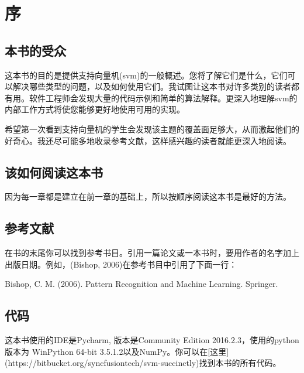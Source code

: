 \chapter*{序}

\section{本书的受众}

这本书的目的是提供支持向量机(svm)的一般概述。您将了解它们是什么，它们可以解决哪些类型的问题，以及如何使用它们。我试图让这本书对许多类别的读者都有用。软件工程师会发现大量的代码示例和简单的算法解释。更深入地理解svm的内部工作方式将使您能够更好地使用可用的实现。

希望第一次看到支持向量机的学生会发现该主题的覆盖面足够大，从而激起他们的好奇心。我还尽可能多地收录参考文献，这样感兴趣的读者就能更深入地阅读。

\section{该如何阅读这本书}

因为每一章都是建立在前一章的基础上，所以按顺序阅读这本书是最好的方法。

\section{参考文献}

在书的末尾你可以找到参考书目。引用一篇论文或一本书时，要用作者的名字加上出版日期。例如，(Bishop, 2006)在参考书目中引用了下面一行：

Bishop, C. M. (2006). Pattern Recognition and Machine Learning. Springer.

\section{代码}

这本书使用的IDE是Pycharm, 版本是Community Edition 2016.2.3，使用的python版本为 WinPython 64-bit 3.5.1.2以及NumPy。你可以在[这里](https://bitbucket.org/syncfusiontech/svm-succinctly)找到本书的所有代码。

